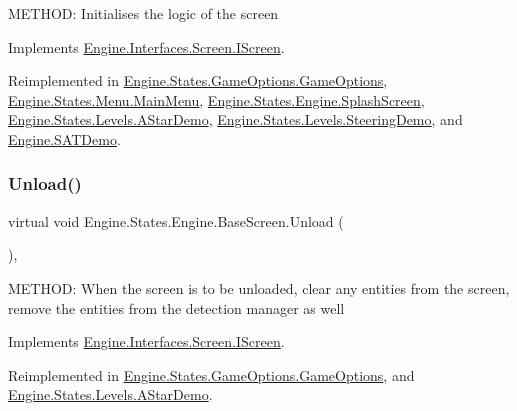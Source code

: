 M\+E\+T\+H\+OD\+: Initialises the logic of the screen 



Implements \hyperlink{a00466_ad251ad712685a0f329ad2b29bde78981}{Engine.\+Interfaces.\+Screen.\+I\+Screen}.



Reimplemented in \hyperlink{a00558_a1547a699546baa41aa39a2e2b4412787}{Engine.\+States.\+Game\+Options.\+Game\+Options}, \hyperlink{a00574_a43b83f0941e721234fdceeb0b5587f1b}{Engine.\+States.\+Menu.\+Main\+Menu}, \hyperlink{a00554_a321c34cdc158a49cf76f31e3cdd0863e}{Engine.\+States.\+Engine.\+Splash\+Screen}, \hyperlink{a00562_a143dfe5c81e8cd31fe6439aad1de00c6}{Engine.\+States.\+Levels.\+A\+Star\+Demo}, \hyperlink{a00570_a3ae8b73b4618e8c2635d3b8c24d70bcb}{Engine.\+States.\+Levels.\+Steering\+Demo}, and \hyperlink{a00566_a051d8aea070a4c7a93f0cf494e4fac6a}{Engine.\+S\+A\+T\+Demo}.

\mbox{\label{a00550_a861ab6364e68e3e3b6b9718e34ba18a2}} 
\subsubsection{\texorpdfstring{Unload()}{Unload()}}
{\footnotesize\ttfamily virtual void Engine.\+States.\+Engine.\+Base\+Screen.\+Unload (\begin{DoxyParamCaption}{ }\end{DoxyParamCaption})\hspace{0.3cm}{\ttfamily [inline]}, {\ttfamily [virtual]}}



M\+E\+T\+H\+OD\+: When the screen is to be unloaded, clear any entities from the screen, remove the entities from the detection manager as well 



Implements \hyperlink{a00466_a67f1b5deb3604a417d7452fc8873de37}{Engine.\+Interfaces.\+Screen.\+I\+Screen}.



Reimplemented in \hyperlink{a00558_aedf1c1415b77bf7c8ce37d754039de7b}{Engine.\+States.\+Game\+Options.\+Game\+Options}, and \hyperlink{a00562_a25e822fbb0f806e84f05a26852c05593}{Engine.\+States.\+Levels.\+A\+Star\+Demo}.

